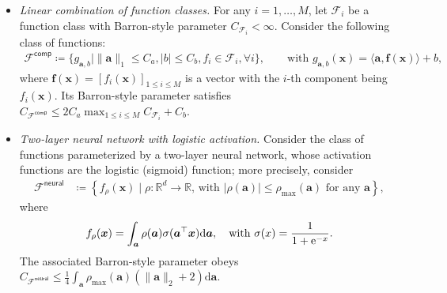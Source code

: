 \documentclass[english]{article}
\begin{document}
\begin{itemize}
	\item {\em Linear combination of function classes.} For any $i=1,\dots, M$, let $\mathcal{F}_i$ be a function class with Barron-style parameter $C_{\mathcal{F}_i}<\infty$.  
		Consider the following class of  functions:  
		\begin{align}
			\mathcal{F}^{\mathsf{comp}} \coloneqq \{ g_{\bm{a},b} \mid \|{\bm a}\|_1\le C_a,|b|\le C_b, f_i\in\mathcal{F}_i, \forall i\},
			\qquad \text{with } g_{\bm{a},b}(\bm{x}) = \langle {\bm a}, {\bm f}({\bm x}) \rangle + b, 
		\end{align}
		where ${\bm f}(\bm{x}) = [f_i(\bm{x})]_{1\leq i\leq M}$ is a vector with the $i$-th component being  $f_i(\bm{x})$. Its Barron-style parameter satisfies $C_{\mathcal{F}^{\mathsf{comp}}}\le 2C_a\max_{1\leq i\leq M}C_{\mathcal{F}_i} + C_b$.
\item {\em Two-layer neural network with logistic activation.}
%
Consider the class of functions parameterized by a two-layer neural network, whose activation functions are the logistic (sigmoid) function; more precisely, consider
%
\begin{align*}
\mathcal{F}^{\mathsf{neural}}
&\coloneqq \left\{f_{\rho}({\bm x}) \mid {\rho} : \mathbb{R}^d \to \mathbb{R}\text{, with } |{\rho}({\bm a})|\le {\rho}_{\max}({\bm a})\text{ for any }\bm{a}
\right\},
\end{align*}
%
where 
\begin{align*}
f_{\rho}({\bm x}) = \int_{\bm a}{\rho}({\bm a})\sigma({\bm a}^{\top}{\bm x})\mathrm{d} {\bm a},\quad \text{with }\sigma(x) = \frac{1}{1+{\rm e}^{-x}}
.
\end{align*}
%
%
The associated Barron-style parameter obeys $C_{\mathcal{F}^{\mathsf{neural}}}\le \frac{1}{4}\int_{\bm a}{\rho}_{\max}({\bm a})
(\|{\bm a}\|_2+2)\mathrm{d} {\bm a}$.
\end{itemize}
\end{document}
